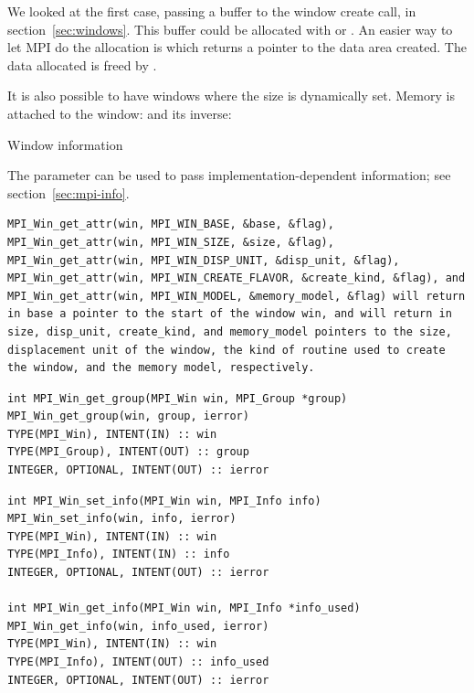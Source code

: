 We looked at the first case, passing a buffer to the window create
call, in section~\ref{sec:windows}. This buffer could be allocated
with  or . An easier way to let MPI
do the allocation is
%
%
which returns a pointer to the data area created.
The data allocated is freed by .

It is also possible to have windows where the size is dynamically set.
%
%
Memory is attached to the window:
%
%
and its inverse:
%

 {Window information}

The  parameter can be used to pass implementation-dependent 
information; see section~\ref{sec:mpi-info}.

\begin{verbatim}
MPI_Win_get_attr(win, MPI_WIN_BASE, &base, &flag), 
MPI_Win_get_attr(win, MPI_WIN_SIZE, &size, &flag), 
MPI_Win_get_attr(win, MPI_WIN_DISP_UNIT, &disp_unit, &flag), 
MPI_Win_get_attr(win, MPI_WIN_CREATE_FLAVOR, &create_kind, &flag), and 
MPI_Win_get_attr(win, MPI_WIN_MODEL, &memory_model, &flag) will return in base a pointer to the start of the window win, and will return in size, disp_unit, create_kind, and memory_model pointers to the size, displacement unit of the window, the kind of routine used to create the window, and the memory model, respectively.
\end{verbatim}

\begin{verbatim}
int MPI_Win_get_group(MPI_Win win, MPI_Group *group) 
MPI_Win_get_group(win, group, ierror) 
TYPE(MPI_Win), INTENT(IN) :: win 
TYPE(MPI_Group), INTENT(OUT) :: group 
INTEGER, OPTIONAL, INTENT(OUT) :: ierror
\end{verbatim}

\begin{verbatim}
int MPI_Win_set_info(MPI_Win win, MPI_Info info)
MPI_Win_set_info(win, info, ierror)
TYPE(MPI_Win), INTENT(IN) :: win
TYPE(MPI_Info), INTENT(IN) :: info
INTEGER, OPTIONAL, INTENT(OUT) :: ierror

int MPI_Win_get_info(MPI_Win win, MPI_Info *info_used)
MPI_Win_get_info(win, info_used, ierror)
TYPE(MPI_Win), INTENT(IN) :: win
TYPE(MPI_Info), INTENT(OUT) :: info_used
INTEGER, OPTIONAL, INTENT(OUT) :: ierror
\end{verbatim}


